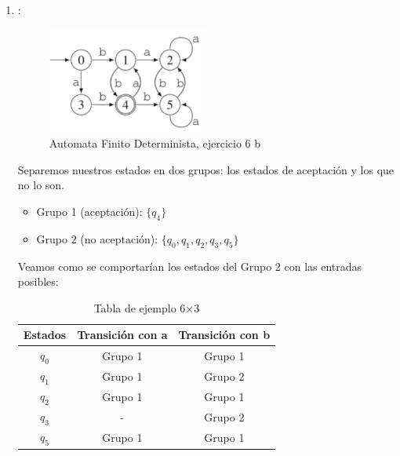 \begin{enumerate}
    \item  : \\
    \begin{figure}[h!]
        \centering
        \includegraphics[width=0.5\textwidth]{images/ejercicio6b.png}
        \caption{Automata Finito Determinista, ejercicio 6 b}
    \end{figure}
    Separemos nuestros estados en dos grupos: los estados de aceptación y los que no lo son.
    \begin{itemize}
        \item Grupo 1 (aceptación): $\{q_4\}$
        \item Grupo 2 (no aceptación): $\{q_0, q_1, q_2, q_3, q_5\}$
    \end{itemize}

    Veamos como se comportarían los estados del Grupo 2 con las entradas posibles:\\
    \begin{table}[h!]
    \centering
    \begin{tabular}{|c|c|c|}
    \hline
    \textbf{Estados} & \textbf{Transición con a} & \textbf{Transición con b } \\
    \hline
    $q_0$ & Grupo 1 & Grupo 1\\
    \hline
    $q_1$ & Grupo 1 & Grupo 2 \\
    \hline
    $q_2$  & Grupo 1 & Grupo 1 \\
    \hline
    $q_3$ & - & Grupo 2 \\
    \hline
    $q_5$ & Grupo 1 & Grupo 1 \\
    \hline
    \end{tabular}
    \caption{Tabla de ejemplo 6×3}
    \label{tab:ejemplo}
    \end{table}



\end{enumerate}
